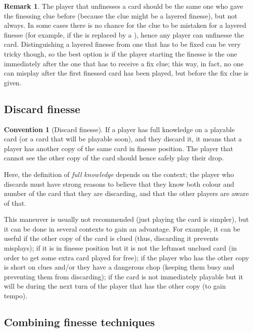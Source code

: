 \documentclass[a4paper]{article}
\theoremstyle{plain}
\theoremstyle{definition}
\newtheorem{remark}[theorem]{Remark}
\newtheorem{convention}[theorem]{Convention}
\begin{document}
\begin{remark}
	The player that unfinesses a card should be the same one who gave the finessing clue before (because the clue might be a layered finesse), but not always. In some cases there is no chance for the clue to be mistaken for a layered finesse (for example, if the  is replaced by a ), hence any player can unfinesse the card. Distinguishing a layered finesse from one that has to be fixed can be very tricky though, so the best option is if the player starting the finesse is the one immediately after the one that has to receive a fix clue; this way, in fact, no one can misplay after the first finessed card has been played, but before the fix clue is given.
\end{remark}

\subsection{Discard finesse}

\begin{convention}[Discard finesse]
	If a player has full knowledge on a playable card (or a card that will be playable soon), and they discard it, it means that a player has another copy of the same card in finesse position. The player that cannot see the other copy of the card should hence safely play their drop.
\end{convention}

Here, the definition of \emph{full knowledge} depends on the context; the player who discards must have strong reasons to believe that they know both colour and number of the card that they are discarding, and that the other players are aware of that.

This maneuver is usually not recommended (just playing the card is simpler), but it can be done in several contexts to gain an advantage. For example, it can be useful if the other copy of the card is clued (thus, discarding it prevents misplays); if it is in finesse position but it is not the leftmost unclued card (in order to get some extra card played for free); if the player who has the other copy is short on clues and/or they have a dangerous chop (keeping them busy and preventing them from discarding); if the card is not immediately playable but it will be during the next turn of the player that has the other copy (to gain tempo).

\subsection{Combining finesse techniques}
\end{document}
